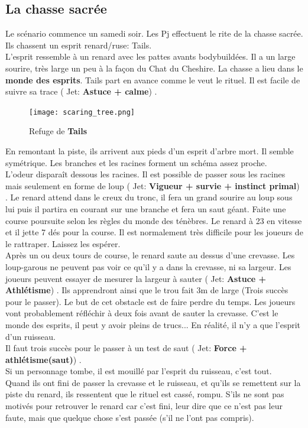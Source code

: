 \documentclass[oneside,12pt]{book}
\newcommand\roll[1]{
( Jet: \textbf{#1})
}
\begin{document}
\begin{flushleft}
\section{La chasse sacrée}
Le scénario commence un samedi soir.
Les Pj effectuent le rite de la chasse sacrée. Ils chassent un esprit renard/ruse: Tails. \\
L'esprit ressemble à un renard avec les pattes avants bodybuildées. Il a un large sourire, très large un peu à la façon du Chat du Cheshire. La chasse a lieu dans le \textbf{monde des esprits}. Tails part en avance comme le veut le rituel. Il est facile de suivre sa trace \roll{Astuce + calme}.\\
\begin{figure}[!h]
\caption{\label{arbre_mort} Refuge de \textbf{Tails}}
\texttt{[image: scaring\_tree.png]}
\end{figure}
 En remontant la piste, ils arrivent aux pieds d'un esprit d'arbre mort. Il semble symétrique. Les branches et les racines forment un schéma assez proche.\\ 
L'odeur disparaît dessous les racines. Il est possible de passer sous les racines mais seulement en forme de loup \roll{Vigueur + survie + instinct primal}. Le renard attend dans le creux du tronc, il fera un grand sourire au loup sous lui puis il partira en courant sur une branche et fera un saut géant. Faite une course poursuite selon les règles du monde des ténèbres. Le renard à 23 en vitesse et il jette 7 dés pour la course. Il est normalement très difficile pour les joueurs de le rattraper. Laissez les espérer.\\ 
Après un ou deux tours de course, le renard saute au dessus d'une crevasse. Les loup-garous ne peuvent pas voir ce qu'il y a dans la crevasse, ni sa largeur. Les joueurs peuvent essayer de mesurer la largeur à sauter \roll{Astuce + Athlétisme}. Ils apprendront ainsi que le trou fait 3m de large (Trois succès pour le passer). Le but de cet obstacle est de faire perdre du temps. Les joueurs vont probablement réfléchir à deux fois avant de sauter la crevasse. C'est le monde des esprits, il peut y avoir pleins de trucs... En réalité, il n'y a que l'esprit d'un ruisseau. \\ 

Il faut trois succès pour le passer à un test de saut \roll{Force + athlétisme(saut)}.\\ 
Si un personnage tombe, il est mouillé par l'esprit du ruisseau, c'est tout.\\
Quand ils ont fini de passer la crevasse et le ruisseau, et qu'ils se remettent sur la piste du renard, ils ressentent que le rituel est cassé, rompu. S'ils ne sont pas motivés pour retrouver le renard car c'est fini, leur dire que ce n'est pas leur faute, mais que quelque chose s'est passée (s'il ne l'ont pas compris). 


\end{flushleft}
\end{document}
